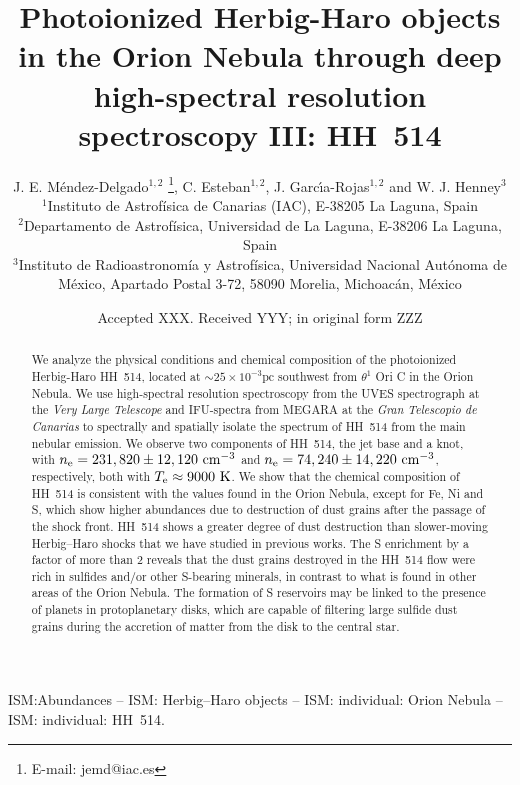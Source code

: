 \documentclass[fleqn,usenatbib]{mnras}
\title[HH~514 in the Orion Nebula]{Photoionized Herbig-Haro objects in the Orion Nebula through deep high-spectral resolution spectroscopy III: HH~514}
\author[J. E. M\'endez-Delgado et al.]
{J. E. M\'endez-Delgado$^{1,2}$ \thanks{E-mail: jemd@iac.es},
C. Esteban$^{1,2}$, J. Garc{\'{\i}}a-Rojas$^{1,2}$ and W. J. Henney$^{3}$  
\\
$^{1}$Instituto de Astrof\'isica de Canarias (IAC), E-38205 La Laguna, Spain\\
$^{2}$Departamento de Astrof\'isica, Universidad de La Laguna, E-38206 La Laguna, Spain\\
$^{3}$Instituto de Radioastronom\'ia y Astrof\'isica, Universidad Nacional Aut\'onoma de M\'exico, Apartado Postal 3-72, 58090 Morelia, Michoac\'an, M\'exico}
\date{Accepted XXX. Received YYY; in original form ZZZ}
\begin{document}
\label{firstpage}
\pagerange{\pageref{firstpage}--\pageref{lastpage}}
\maketitle

\begin{abstract}
  We analyze the physical conditions and chemical composition of the photoionized Herbig-Haro HH~514, located at $\sim 25 \times 10^{-3} \text {pc}$ southwest from $\theta^1$ Ori C in the Orion Nebula. We use high-spectral resolution spectroscopy from the UVES spectrograph at the \textit{Very Large Telescope} and IFU-spectra from MEGARA at the \textit{Gran Telescopio de Canarias} to spectrally and spatially isolate the spectrum of HH~514 from the main nebular emission. We observe two components of HH~514, the jet base and a knot, with $n_{\rm e}= 231,820 \pm 12,120\text{ cm}^{-3}$ and $n_{\rm e}= 74,240 \pm 14,220\text{ cm}^{-3}$, respectively, both with $T_{\rm e}\approx 9000 \text{ K}$. We show that the chemical composition of HH~514 is consistent with the values found in the Orion Nebula, except for Fe, Ni and S, which show higher abundances due to  destruction of dust grains after the passage of the shock front.
  HH~514 shows a greater degree of dust destruction than slower-moving Herbig--Haro shocks that we have studied in previous works.
The S enrichment by a factor of more than 2 reveals that the dust grains destroyed in the HH~514 flow were rich in sulfides and/or other S-bearing minerals, in contrast to what is found in other areas of the Orion Nebula. The formation of S reservoirs may be linked to the presence of planets in protoplanetary disks, which are capable of filtering large sulfide dust grains during the accretion of matter from the disk to the central star. %
\end{abstract}

\begin{keywords}
ISM:Abundances – ISM: Herbig–Haro objects – ISM: individual:
Orion Nebula – ISM: individual: HH~514.
\end{keywords}
\end{document}
